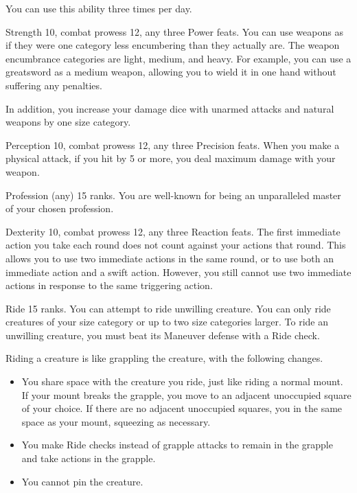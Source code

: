 You can use this ability three times per day.

\featpres Strength 10, combat prowess 12, any three Power feats.
\featben You can use weapons as if they were one category less encumbering than they actually are.
The weapon encumbrance categories are light, medium, and heavy.
For example, you can use a greatsword as a medium weapon, allowing you to wield it in one hand without suffering any penalties.

In addition, you increase your damage dice with unarmed attacks and natural weapons by one size category.

\featpres Perception 10, combat prowess 12, any three Precision feats.
\featben When you make a physical attack, if you hit by 5 or more, you deal maximum damage with your weapon.

\featpre Profession (any) 15 ranks.
\featben You are well-known for being an unparalleled master of your chosen profession.

\featpres Dexterity 10, combat prowess 12, any three Reaction feats.
\featben The first immediate action you take each round does not count against your actions that round.
This allows you to use two immediate actions in the same round, or to use both an immediate action and a swift action.
However, you still cannot use two immediate actions in response to the same triggering action.

\featpre Ride 15 ranks.
\featben You can attempt to ride unwilling creature.
You can only ride creatures of your size category or up to two size categories larger.
To ride an unwilling creature, you must beat its Maneuver defense with a Ride check.

Riding a creature is like grappling the creature, with the following changes.
\begin{itemize}
    \item You share space with the creature you ride, just like riding a normal mount.
        If your mount breaks the grapple, you move to an adjacent unoccupied square of your choice.
        If there are no adjacent unoccupied squares, you in the same space as your mount, squeezing as necessary.
    \item You make Ride checks instead of grapple attacks to remain in the grapple and take actions in the grapple.
    \item You cannot pin the creature.
\end{itemize}

